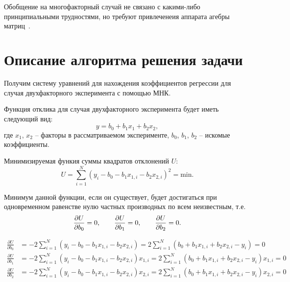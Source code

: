 Обобщение на многофакторный случай не связано с какими-либо принципиальными трудностями, но требуют привлеченеия аппарата агебры матриц~\cite{adler_1976}.


\section{Описание алгоритма решения задачи}

Получим систему уравнений для нахождения коэффициентов регрессии для случая двухфакторного эксперимента с помощью МНК.

Функция отклика для случая двухфакторного эксперимента будет иметь следующий вид:
\begin{equation}
    y = b_0 + b_1 x_1 + b_2 x_2,
\end{equation}
где $x_1$, $x_2$ -- факторы в рассматриваемом эксперименте, $b_0$, $b_1$, $b_2$ -- искомые коэффициенты.

Минимизируемая функия суммы квадратов отклонений $U$:
\begin{equation}
    U = \sum_{i=1}^{N}(y_i - b_0 - b_1 x_{1,i} - b_2 x_{2,i})^2 =  \text{min}.
    \label{math:mnk_full}
\end{equation}

Минимум данной функции, если он существует, будет достигаться при одновременном равенстве нулю частных производных по всем неизвестным, т.е.
\begin{equation}
    \frac{\partial{U}}{\partial{b_0}} = 0, \text{\hspace{2em}}  \frac{\partial{U}}{\partial{b_1}} = 0, \text{\hspace{2em}}  \frac{\partial{U}}{\partial{b_2}}  = 0.
\end{equation}


\begin{equation}
    \begin{aligned}
        \frac{\partial{U}}{\partial{b_0}} & = -2 \sum_{i=1}^{N}{(y_i - b_0 - b_1 x_{1,i} - b_2 x_{2,i}) = 2 \sum_{i=1}^{N}{(b_0 + b_1 x_{1,i} + b_2 x_{2,i} - y_i)}} = 0 \\[1em]
        \frac{\partial{U}}{\partial{b_1}} & = -2 \sum_{i=1}^{N}{(y_i - b_0 - b_1 x_{1,i} - b_2 x_{2,i})x_{1,i} = 2 \sum_{i=1}^{N}{(b_0 + b_1 x_{1,i} + b_2 x_{2,i} - y_i)x_{1,i}}} = 0 \\[1em]
        \frac{\partial{U}}{\partial{b_2}} & = -2 \sum_{i=1}^{N}{(y_i - b_0 - b_1 x_{1,i} - b_2 x_{2,i})x_{2,i} = 2 \sum_{i=1}^{N}{(b_0 + b_1 x_{1,i} + b_2 x_{2,i} - y_i)x_{2,i}}} = 0
    \end{aligned}
\end{equation}

